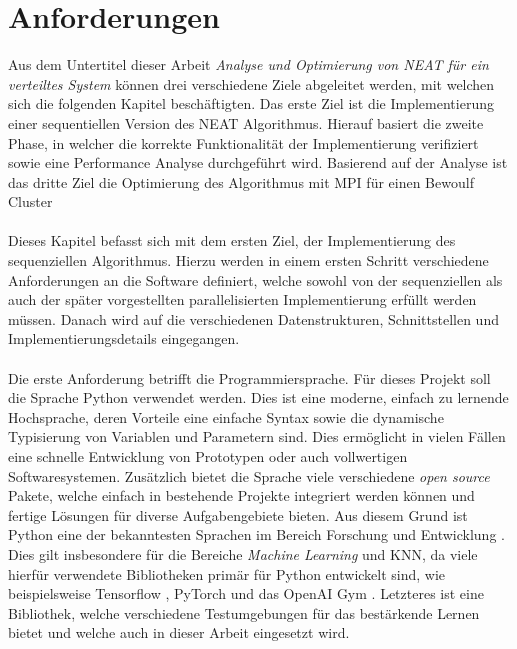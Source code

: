 \section{Anforderungen}
\label{sec:requirements}
Aus dem Untertitel dieser Arbeit \emph{Analyse und Optimierung von \ac{NEAT} für ein verteiltes System} können drei verschiedene Ziele abgeleitet werden, mit welchen sich die folgenden Kapitel beschäftigten. Das erste Ziel ist die Implementierung einer sequentiellen Version des \ac{NEAT} Algorithmus. Hierauf basiert die zweite Phase, in welcher die korrekte Funktionalität der Implementierung verifiziert sowie eine Performance Analyse durchgeführt wird. 
Basierend auf der Analyse ist das dritte Ziel die Optimierung des Algorithmus mit \ac{MPI} für einen Bewoulf Cluster
\\\\
Dieses Kapitel befasst sich mit dem ersten Ziel, der Implementierung des sequenziellen Algorithmus. Hierzu werden in einem ersten Schritt verschiedene Anforderungen an die Software definiert, welche sowohl von der sequenziellen als auch der später vorgestellten parallelisierten Implementierung erfüllt werden müssen. Danach wird auf die verschiedenen Datenstrukturen, Schnittstellen und Implementierungsdetails eingegangen.
\\\\
Die erste Anforderung betrifft die Programmiersprache. Für dieses Projekt soll die Sprache Python verwendet werden. Dies ist eine moderne, einfach zu lernende Hochsprache, deren Vorteile eine einfache Syntax sowie die dynamische Typisierung von Variablen und Parametern sind. Dies ermöglicht in vielen Fällen eine schnelle Entwicklung von Prototypen oder auch vollwertigen Softwaresystemen. Zusätzlich bietet die Sprache viele verschiedene \emph{open source} Pakete, welche einfach in bestehende Projekte integriert werden können und fertige Lösungen für diverse Aufgabengebiete bieten. Aus diesem Grund ist Python eine der bekanntesten Sprachen im Bereich Forschung und Entwicklung \cite{dalcin2011parallel}. Dies gilt insbesondere für die Bereiche \emph{Machine Learning} und \ac{KNN}, da viele hierfür verwendete Bibliotheken primär für Python entwickelt sind, wie beispielsweise Tensorflow \cite{tensorflow2015}, PyTorch \cite{pytorch2019} und das OpenAI Gym \cite{OpenAiGym2016}. Letzteres ist eine Bibliothek, welche verschiedene Testumgebungen für das bestärkende Lernen bietet und welche auch in dieser Arbeit eingesetzt wird.  
\\\\
